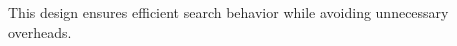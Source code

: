 This design ensures efficient search behavior while avoiding unnecessary overheads.


%
%
%
%
%
%
%
